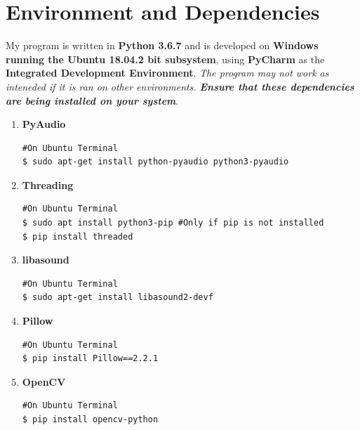 \documentclass[a4paper,11pt]{article}
\begin{document}
\section{Environment and Dependencies}
My program is written in \textbf{Python 3.6.7} and is developed on \textbf{Windows running the Ubuntu 18.04.2 bit subsystem}, using \textbf{PyCharm} as the \textbf{Integrated Development Environment}. \textit{The program may not work as inteneded if it is ran on other environments.}
\textit{\textbf{Ensure that these dependencies are being installed on your system}}.
\begin{enumerate}
  \item \textbf{PyAudio}
\begin{mdframed}[backgroundcolor=light-gray, roundcorner=30pt,leftmargin=1, rightmargin=1, innerleftmargin=5, innertopmargin=-3,innerbottommargin=5, outerlinewidth=1, linecolor=light-gray]
\begin{lstlisting}
#On Ubuntu Terminal
$ sudo apt-get install python-pyaudio python3-pyaudio
\end{lstlisting}
\end{mdframed}
  \item \textbf{Threading}
\begin{mdframed}[backgroundcolor=light-gray, roundcorner=30pt,leftmargin=1, rightmargin=1, innerleftmargin=5, innertopmargin=-3,innerbottommargin=5, outerlinewidth=1, linecolor=light-gray]
\begin{lstlisting}
#On Ubuntu Terminal
$ sudo apt install python3-pip #Only if pip is not installed
$ pip install threaded
\end{lstlisting}
\end{mdframed}
  \item \textbf{libasound}
\begin{mdframed}[backgroundcolor=light-gray, roundcorner=30pt,leftmargin=1, rightmargin=1, innerleftmargin=5, innertopmargin=-3,innerbottommargin=5, outerlinewidth=1, linecolor=light-gray]
\begin{lstlisting}
#On Ubuntu Terminal
$ sudo apt-get install libasound2-devf
\end{lstlisting}
\end{mdframed}
  \item \textbf{Pillow}
\begin{mdframed}[backgroundcolor=light-gray, roundcorner=30pt,leftmargin=1, rightmargin=1, innerleftmargin=5, innertopmargin=-3,innerbottommargin=5, outerlinewidth=1, linecolor=light-gray]
\begin{lstlisting}
#On Ubuntu Terminal
$ pip install Pillow==2.2.1
\end{lstlisting}
\end{mdframed}
  \item \textbf{OpenCV}
\begin{mdframed}[backgroundcolor=light-gray, roundcorner=30pt,leftmargin=1, rightmargin=1, innerleftmargin=5, innertopmargin=-3,innerbottommargin=5, outerlinewidth=1, linecolor=light-gray]
\begin{lstlisting}
#On Ubuntu Terminal
$ pip install opencv-python
\end{lstlisting}
\end{mdframed}
\end{enumerate}
\end{document}
